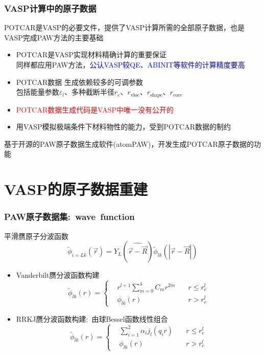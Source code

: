 \frame
{
	\frametitle{\textrm{VASP}计算中的原子数据}
	\textrm{POTCAR}是\textrm{VASP}的必要文件，提供了\textrm{VASP}计算所需的全部原子数据，也是\textrm{VASP}完成\textrm{PAW}方法的主要基础
	\begin{itemize}
		\item \textrm{POTCAR}是\textrm{VASP}实现材料精确计算的重要保证\\
			同样都应用\textrm{PAW}方法，\textcolor{blue}{公认\textrm{VASP}较\textrm{QE}、\textrm{ABINIT}等软件的计算精度要高}
		\item \textrm{POTCAR}数据 生成依赖较多的可调参数\\
			包括能量参数$\varepsilon_l$、多种截断半径$r_c$、$r_{\mathrm{vloc}}$、$r_{\mathrm{shape}}$、$r_{\mathrm{core}}$
		\item \textcolor{red}{\textrm{POTCAR}数据生成代码是\textrm{VASP}中唯一没有公开的}
		\item 用\textrm{VASP}模拟极端条件下材料物性的能力，受到\textrm{POTCAR}数据的制约
	\end{itemize}

	基于开源的\textrm{PAW}原子数据生成软件(\textrm{atomPAW})，开发生成\textrm{POTCAR}原子数据的功能
}

\section{\rm{VASP}的原子数据重建}
\frame
{
	\frametitle{\textrm{PAW}原子数据集:~\textrm{wave~function}}
	平滑赝原子分波函数
	\begin{displaymath}
		\tilde\phi_{i=Lk}(\vec r)=Y_L(\widehat{\vec r-\vec R})\tilde\phi_{lk}(|\vec r-\vec R|)
	\end{displaymath}
	\vskip -3pt
	\begin{itemize}
		\item \textrm{Vanderbilt}赝分波函数构建
			\begin{displaymath}
		\tilde\phi_{lk}(r)=\left\{
			\begin{aligned}
				&r^{l+1}\sum_{m=0}^4C_mr^{2m}\quad &r\leqslant r_c^l\\
			&\phi_{lk}(r)\quad&r>r_c^l
			\end{aligned}
		\right.
			\end{displaymath}
			{\fontsize{7.5pt}{5.2pt}}
		\item \textrm{RRKJ}赝分波函数构建:~由球\textrm{Bessel}函数线性组合%
	\begin{displaymath}
		\tilde\phi_{lk}(r)=\left\{
		\begin{aligned} 
			&\sum_{i=1}^2\alpha_ij_l(q_ir)\quad &r\leqslant r_c^l\\
			&\phi_{lk}(r)\quad&r>r_c^l
		\end{aligned}
		\right.
	\end{displaymath}
	{\fontsize{7.5pt}{5.2pt}}
	\end{itemize}
}

